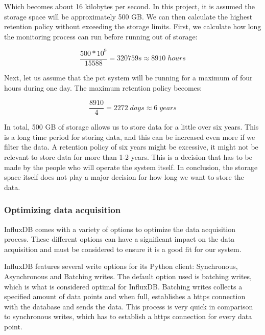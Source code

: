 \documentclass[main.tex]{subfiles}
\begin{document}
Which becomes about 16 kilobytes per second. In this project, it is assumed the storage space will be approximately 500 GB. We can then calculate the highest retention policy without exceeding the storage limits. First, we calculate how long the monitoring process can run before running out of storage:

\begin{equation} \label{eqn:total_bytes_total}
\frac{500 * 10^9}{15588} = 320759s \approx 8910\; hours
\end{equation}

Next, let us assume that the \gls{pct} system will be running for a maximum of four hours during one day. The maximum retention policy becomes:

\begin{equation} \label{eqn:total_retention}
\frac{8910}{4} = 2272\; days \approx 6\; years
\end{equation}

In total, 500 GB of storage allows us to store data for a little over six years. This is a long time period for storing data, and this can be increased even more if we filter the data. A retention policy of six years might be excessive, it might not be relevant to store data for more than 1-2 years. This is a decision that has to be made by the people who will operate the system itself. In conclusion, the storage space itself does not play a major decision for how long we want to store the data.



\subsubsection{Optimizing data acquisition}

InfluxDB comes with a variety of options to optimize the data acquisition process. These different options can have a significant impact on the data acquisition and must be considered to ensure it is a good fit for our system.

InfluxDB features several write options for its Python client: Synchronous, Asynchronous and Batching writes. The default option used is batching writes, which is what is considered optimal for InfluxDB. Batching writes collects a specified amount of data points and when full, establishes a https connection with the database and sends the data. This process is very quick in comparison to synchronous writes, which has to establish a https connection for every data point.
\end{document}
